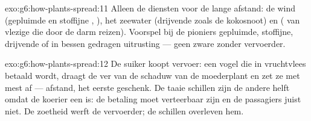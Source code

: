 \begin{solution}{exo:g6:how-plants-spread:11}
Alleen de diensten voor de lange afstand: de wind (gepluimde en
stoffijne , ), het zeewater (drijvende  zoals de
kokosnoot) en  ( van vlezige  die door de darm reizen).
Voorspel bij de pioniers gepluimde, stoffijne, drijvende of in bessen
gedragen uitrusting --- geen zware  zonder vervoerder.
\end{solution}

\begin{solution}{exo:g6:how-plants-spread:12}
De suiker koopt vervoer: een vogel die in vruchtvlees betaald wordt,
draagt de  ver van de schaduw van de moederplant en zet ze met mest
af --- afstand, het eerste geschenk. De taaie schillen zijn de andere
helft omdat de koerier een  is: de betaling moet
verteerbaar zijn en de passagiers juist niet. De zoetheid werft de
vervoerder; de schillen overleven hem.
\end{solution}

